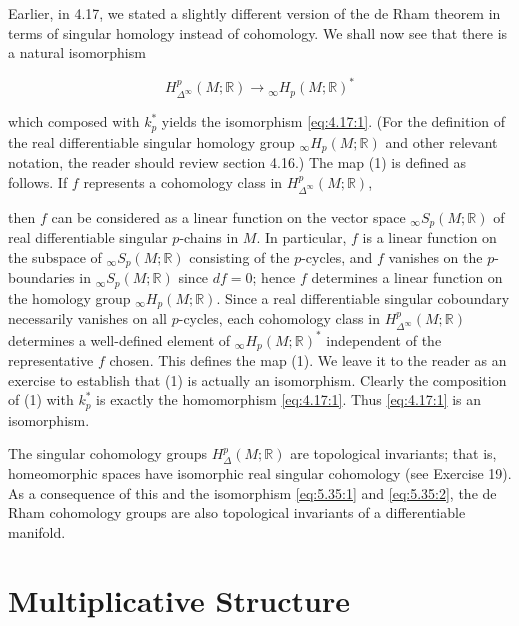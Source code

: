 \label{thm:5.37}Earlier, in 4.17, we stated a slightly different version of the de Rham theorem in terms of singular homology instead of cohomology. We shall now see that there is a natural isomorphism

\begin{equation}
\tag{1}\label{eq:5.37:1}
H_{\Delta^{\infty}}^{p}(M;\mathbb{R})\to{}_{\infty}H_{p}(M;\mathbb{R})^{*}
\end{equation}

which composed with $k_{p}^{*}$ yields the isomorphism \eqref{eq:4.17:1}. (For the definition of the real differentiable singular homology group ${}_{\infty}H_{p}(M;\mathbb{R})$ and other relevant notation, the reader should review section 4.16.) The map (1) is defined as follows. If $f$ represents a cohomology class in $H_{\Delta^{\infty}}^{p}(M;\mathbb{R})$,

then $f$ can be considered as a linear function on the vector space ${}_{\infty}S_{p}(M;\mathbb{R})$ of real differentiable singular $p$-chains in $M$. In particular, $f$ is a linear function on the subspace of ${}_{\infty}S_{p}(M;\mathbb{R})$ consisting of the $p$-cycles, and $f$ vanishes on the $p$-boundaries in ${}_{\infty}S_{p}(M;\mathbb{R})$ since $df=0$; hence $f$ determines a linear function on the homology group ${}_{\infty}H_{p}(M;\mathbb{R})$. Since a real differentiable singular coboundary necessarily vanishes on all $p$-cycles, each cohomology class in $H_{\Delta^{\infty}}^{p}(M;\mathbb{R})$ determines a well-defined element of ${}_{\infty}H_{p}(M;\mathbb{R})^{*}$ independent of the representative $f$ chosen. This defines the map (1). We leave it to the reader as an exercise to establish that (1) is actually an isomorphism. Clearly the composition of (1) with $k_p^{*}$ is exactly the homomorphism \eqref{eq:4.17:1}. Thus \eqref{eq:4.17:1} is an isomorphism.



\begin{remarks}\label{thm:5.38}
The singular cohomology groups $H_{\Delta}^{p}(M;\mathbb{R})$ are topological invariants; that is, homeomorphic spaces have isomorphic real singular cohomology (see Exercise 19). As a consequence of this and the isomorphism \eqref{eq:5.35:1} and \eqref{eq:5.35:2}, the de Rham cohomology groups are also topological invariants of a differentiable manifold.

\end{remarks}

\section{Multiplicative Structure}


